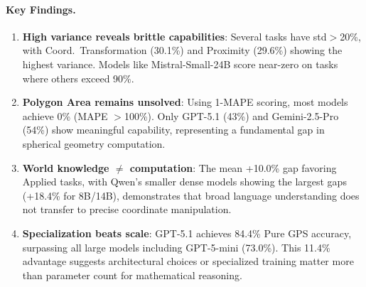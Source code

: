 \paragraph{Key Findings.}
\begin{enumerate}[leftmargin=*, itemsep=2pt]
    \item \textbf{High variance reveals brittle capabilities}: Several tasks have std$>$20\%, with Coord.\ Transformation (30.1\%) and Proximity (29.6\%) showing the highest variance. Models like Mistral-Small-24B score near-zero on tasks where others exceed 90\%.

    \item \textbf{Polygon Area remains unsolved}: Using 1-MAPE scoring, most models achieve 0\% (MAPE $>$100\%). Only GPT-5.1 (43\%) and Gemini-2.5-Pro (54\%) show meaningful capability, representing a fundamental gap in spherical geometry computation.

    \item \textbf{World knowledge $\neq$ computation}: The mean +10.0\% gap favoring Applied tasks, with Qwen's smaller dense models showing the largest gaps (+18.4\% for 8B/14B), demonstrates that broad language understanding does not transfer to precise coordinate manipulation.

    \item \textbf{Specialization beats scale}: GPT-5.1 achieves 84.4\% Pure GPS accuracy, surpassing all large models including GPT-5-mini (73.0\%). This 11.4\% advantage suggests architectural choices or specialized training matter more than parameter count for mathematical reasoning.
\end{enumerate}
